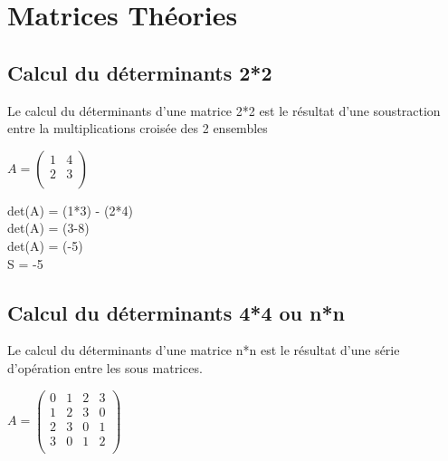 
\newpage
\section{Matrices Théories}
\vspace{10mm} %

\subsection{Calcul du déterminants 2*2}
\vspace{5mm} %
Le calcul du déterminants d'une matrice 2*2 est le résultat d'une soustraction entre la multiplications croisée des 2 ensembles \\

\vspace{5mm} %

$
A =
\begin{pmatrix}
  1 & 4 \\
  2 & 3 \\
\end{pmatrix}
$

\vspace{5mm} %

det(A) = (1*3) - (2*4)\\

det(A) = (3-8)\\

det(A) = (-5)\\

S = -5\\

\subsection{Calcul du déterminants 4*4 ou n*n}
\vspace{5mm} %
Le calcul du déterminants d'une matrice n*n est le résultat d'une série d'opération entre les sous matrices.
\vspace{5mm} %

$
A =
\begin{pmatrix}
  0 & 1 & 2 & 3 \\
  1 & 2 & 3 & 0 \\
  2 & 3 & 0 & 1 \\
  3 & 0 & 1 & 2 \\
\end{pmatrix}
$

\vspace{10mm} %

